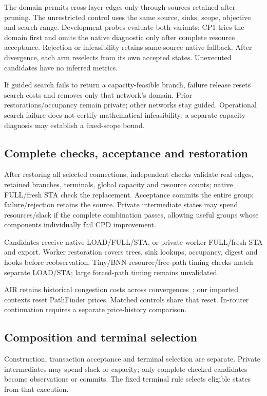 \documentclass[conference,10pt]{IEEEtran}
\begin{document}
The domain permits cross-layer edges only through sources retained after pruning. The unrestricted control uses the same source, sinks, scope, objective and search range. Development probes evaluate both variants; CP1 tries the domain first and omits the native diagnostic only after complete resource acceptance. Rejection or infeasibility retains same-source native fallback. After divergence, each arm reselects from its own accepted states. Unexecuted candidates have no inferred metrics.

If guided search fails to return a capacity-feasible branch, failure release resets search costs and removes only that network's domain. Prior restorations/occupancy remain private; other networks stay guided. Operational search failure does not certify mathematical infeasibility; a separate capacity diagnosis may establish a fixed-scope bound.

\subsection{Complete checks, acceptance and restoration}
After restoring all selected connections, independent checks validate real edges, retained branches, terminals, global capacity and resource counts; native FULL/fresh STA check the replacement. Acceptance commits the entire group; failure/rejection retains the source. Private intermediate states may spend resources/slack if the complete combination passes, allowing useful groups whose components individually fail CPD improvement.

Candidates receive native LOAD/FULL/STA, or private-worker FULL/fresh STA and export. Worker restoration covers trees, sink lookups, occupancy, digest and hooks before reobservation. Tiny/BNN-resource/free-path timing checks match separate LOAD/STA; large forced-path timing remains unvalidated.

AIR retains historical congestion costs across convergences~\cite{air}; our imported contexts reset PathFinder prices. Matched controls share that reset. In-router continuation requires a separate price-history comparison.


\subsection{Composition and terminal selection}
Construction, transaction acceptance and terminal selection are separate. Private intermediates may spend slack or capacity; only complete checked candidates become observations or commits. The fixed terminal rule selects eligible states from that execution.
\end{document}
